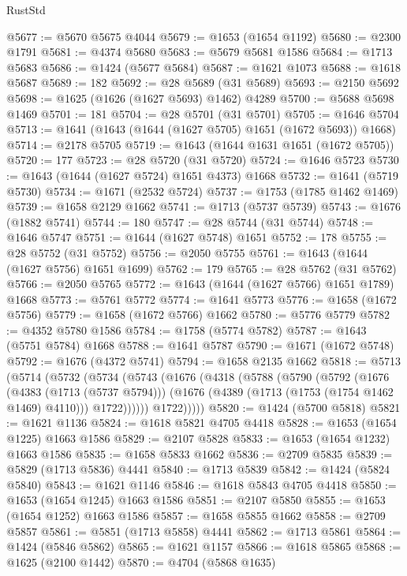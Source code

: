 \begin{lexlean}{RustStd}
\begin{coremodule}
@5677 := @5670 @5675 @4044
@5679 := @1653 (@1654 @1192)
@5680 := @2300 @1791
@5681 := @4374 @5680
@5683 := @5679 @5681 @1586
@5684 := @1713 @5683
@5686 := @1424 (@5677 @5684)
@5687 := @1621 @1073
@5688 := @1618 @5687
@5689 := 182
@5692 := @28 @5689 (@31 @5689)
@5693 := @2150 @5692
@5698 := @1625 (@1626 (@1627 @5693) @1462) @4289
@5700 := @5688 @5698 @1469
@5701 := 181
@5704 := @28 @5701 (@31 @5701)
@5705 := @1646 @5704
@5713 := @1641 (@1643 (@1644 (@1627 @5705) @1651 (@1672 @5693)) @1668)
@5714 := @2178 @5705
@5719 := @1643 (@1644 @1631 @1651 (@1672 @5705))
@5720 := 177
@5723 := @28 @5720 (@31 @5720)
@5724 := @1646 @5723
@5730 := @1643 (@1644 (@1627 @5724) @1651 @4373) @1668
@5732 := @1641 (@5719 @5730)
@5734 := @1671 (@2532 @5724)
@5737 := @1753 (@1785 @1462 @1469)
@5739 := @1658 @2129 @1662
@5741 := @1713 (@5737 @5739)
@5743 := @1676 (@1882 @5741)
@5744 := 180
@5747 := @28 @5744 (@31 @5744)
@5748 := @1646 @5747
@5751 := @1644 (@1627 @5748) @1651
@5752 := 178
@5755 := @28 @5752 (@31 @5752)
@5756 := @2050 @5755
@5761 := @1643 (@1644 (@1627 @5756) @1651 @1699)
@5762 := 179
@5765 := @28 @5762 (@31 @5762)
@5766 := @2050 @5765
@5772 := @1643 (@1644 (@1627 @5766) @1651 @1789) @1668
@5773 := @5761 @5772
@5774 := @1641 @5773
@5776 := @1658 (@1672 @5756)
@5779 := @1658 (@1672 @5766) @1662
@5780 := @5776 @5779
@5782 := @4352 @5780 @1586
@5784 := @1758 (@5774 @5782)
@5787 := @1643 (@5751 @5784) @1668
@5788 := @1641 @5787
@5790 := @1671 (@1672 @5748)
@5792 := @1676 (@4372 @5741)
@5794 := @1658 @2135 @1662
@5818 := @5713
    (@5714
      (@5732
        (@5734
          (@5743
            (@1676
              (@4318
                (@5788
                  (@5790
                    (@5792
                      (@1676
                        (@4383 (@1713 (@5737 @5794)))
                        (@1676 (@4389 (@1713 (@1753 (@1754 @1462 @1469) @4110))) @1722))))))
              @1722)))))
@5820 := @1424 (@5700 @5818)
@5821 := @1621 @1136
@5824 := @1618 @5821 @4705 @4418
@5828 := @1653 (@1654 @1225) @1663 @1586
@5829 := @2107 @5828
@5833 := @1653 (@1654 @1232) @1663 @1586
@5835 := @1658 @5833 @1662
@5836 := @2709 @5835
@5839 := @5829 (@1713 @5836) @4441
@5840 := @1713 @5839
@5842 := @1424 (@5824 @5840)
@5843 := @1621 @1146
@5846 := @1618 @5843 @4705 @4418
@5850 := @1653 (@1654 @1245) @1663 @1586
@5851 := @2107 @5850
@5855 := @1653 (@1654 @1252) @1663 @1586
@5857 := @1658 @5855 @1662
@5858 := @2709 @5857
@5861 := @5851 (@1713 @5858) @4441
@5862 := @1713 @5861
@5864 := @1424 (@5846 @5862)
@5865 := @1621 @1157
@5866 := @1618 @5865
@5868 := @1625 (@2100 @1442)
@5870 := @4704 (@5868 @1635)

\end{coremodule}
\end{lexlean}
